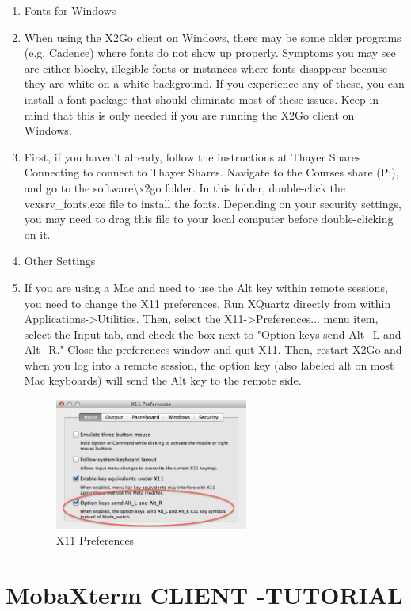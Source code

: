 \begin{enumerate}[resume]
	\item Fonts for Windows
	\item When using the X2Go client on Windows, there may be some older programs (e.g. Cadence) where fonts do not show up properly. Symptoms you may see are either blocky, illegible fonts or instances where fonts disappear because they are white on a white background. If you experience any of these, you can install a font package that should eliminate most of these issues. Keep in mind that this is only needed if you are running the X2Go client on Windows.
	\item First, if you haven't already, follow the instructions at Thayer Shares Connecting to connect to Thayer Shares. Navigate to the Courses share (P:), and go to the software\textbackslash x2go folder. In this folder, double-click the vcxsrv\_fonts.exe file to install the fonts. Depending on your security settings, you may need to drag this file to your local computer before double-clicking on it.
	\item Other Settings
	\item If you are using a Mac and need to use the Alt key within remote sessions, you need to change the X11 preferences. Run XQuartz directly from within Applications-\textgreater Utilities. Then, select the X11-\textgreater Preferences... menu item, select the Input tab, and check the box next to "Option keys send Alt\_L and Alt\_R." Close the preferences window and quit X11. Then, restart X2Go and when you log into a remote session, the option key (also labeled alt on most Mac keyboards) will send the Alt key to the remote side.
\begin{figure}[!htb]
	\centering
	\includegraphics[width=0.6\textwidth]{src/images/image13.png}
	\caption{X11 Preferences}
	\label{fig:fig13}
\end{figure}
\end{enumerate}

\textbf{\hfill\break
}
\section*{MobaXterm CLIENT -TUTORIAL}

